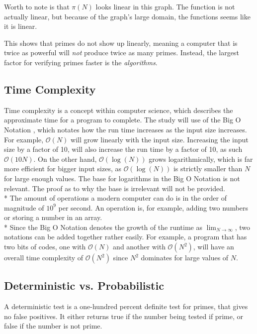 \documentclass[main.tex]{subfiles}
\begin{document}
Worth to note is that $\pi(N)$ looks linear in this graph. The function is not
actually linear, but because of the graph's large domain, the functions seems
like it is linear.

This shows that primes do not show up linearly, meaning a computer that is
twice as powerful will \textit{not} produce twice as many primes. Instead, the
largest factor for verifying primes faster is the \textit{algorithms}.

\subsection{Time Complexity}

Time complexity \cite{theorem:time_comp} is a concept within computer science,
which describes the approximate time for a program to complete. The study will
use of the Big O Notation \cite{theorem:big_O}, which notates how the run time
increases as the input size increases. For example, $\mathcal{O}(N)$ will grow
linearly with the input size. Increasing the input size by a factor of 10, will
also increase the run time by a factor of 10, as such $\mathcal{O}(10N)$. On the
other hand, $\mathcal{O}(\log(N))$ grows logarithmically, which is far more
efficient for bigger input sizes, as $\mathcal{O}(\log(N))$ is strictly smaller
than $N$ for large enough values. The base for logarithms in the Big O Notation
is not relevant. The proof as to why the base is irrelevant will not be
provided. \newline
\\*
The amount of operations a modern computer can do is in the order of magnitude
of $10^{9}$ per second. An operation is, for example, adding two numbers or
storing a number in an array. \newline
\\*
Since the Big O Notation denotes the growth of the runtime as
$\lim_{N\to\infty}$, two notations can be added together rather easily. For
example, a program that has two bits of codes, one with $\mathcal{O}(N)$ and
another with $\mathcal{O}(N^{2})$, will have an overall time complexity of
$\mathcal{O}(N^{2})$ since $N^{2}$ dominates for large values of $N$.

\subsection{Deterministic vs. Probabilistic}
A deterministic test is a one-hundred percent definite test for primes, that
gives no false positives. It either returns true if the number being tested if
prime, or false if the number is not prime. \newline
\end{document}
